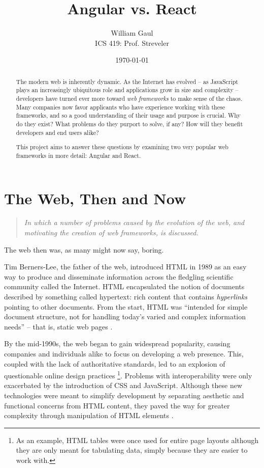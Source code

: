 \documentclass[12pt,letterpaper]{article}
\title{\textbf{Angular vs. React}}
\author{William Gaul\\{ICS 419: Prof. Streveler}}
\date{\today}
\begin{document}
\maketitle

\begin{singlespace*}
\begin{abstract}
	The modern web is inherently dynamic. As the Internet has evolved -- as JavaScript plays an increasingly ubiquitous role and applications grow in size and complexity -- developers have turned ever more toward \emph{web frameworks} to make sense of the chaos. Many companies now favor applicants who have experience working with these frameworks, and so a good understanding of their usage and purpose is crucial. Why do they exist? What problems do they purport to solve, if any? How will they benefit developers and end users alike?

	This project aims to answer these questions by examining two very popular web frameworks in more detail: Angular and React.
\end{abstract}
\end{singlespace*}


\section{The Web, Then and Now}
\vspace{-12pt}

\begin{quote}
	\singlespacing
	\emph{In which a number of problems caused by the evolution of the web, and motivating the creation of web frameworks, is discussed.}
\end{quote}

The web then was, as many might now say, boring.

Tim Berners-Lee, the father of the web, introduced HTML in 1989 as an easy way to produce and disseminate information across the fledgling scientific community called the Internet. HTML encapsulated the notion of documents described by something called hypertext: rich content that contains \emph{hyperlinks} pointing to other documents. From the start, HTML was ``intended for simple document structure, not for handling today's varied and complex information needs'' \cite[p.~9]{Sklar:2012} -- that is, static web pages \cite{Schlensker:2014}.

By the mid-1990s, the web began to gain widespread popularity, causing companies and individuals alike to focus on developing a web presence. This, coupled with the lack of authoritative standards, led to an explosion of questionable online design practices \footnote{As an example, HTML tables were once used for entire page layouts although they are only meant for tabulating data, simply because they are easier to work with.}. Problems with interoperability were only exacerbated by the introduction of CSS and JavaScript. Although these new technologies were meant to simplify development by separating aesthetic and functional concerns from HTML content, they paved the way for greater complexity through manipulation of HTML elements \cite{Sklar:2012}.
\end{document}
